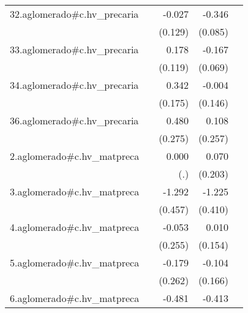 {\begin{longtable}{l*{4}{D{.}{.}{-1}}}
\addlinespace
32.aglomerado#c.hv\_precaria&                     &      -0.027         &      -0.346\sym{***}&                     \\
            &                     &     (0.129)         &     (0.085)         &                     \\
\addlinespace
33.aglomerado#c.hv\_precaria&                     &       0.178         &      -0.167\sym{*}  &                     \\
            &                     &     (0.119)         &     (0.069)         &                     \\
\addlinespace
34.aglomerado#c.hv\_precaria&                     &       0.342         &      -0.004         &                     \\
            &                     &     (0.175)         &     (0.146)         &                     \\
\addlinespace
36.aglomerado#c.hv\_precaria&                     &       0.480         &       0.108         &                     \\
            &                     &     (0.275)         &     (0.257)         &                     \\
\addlinespace
2.aglomerado#c.hv\_matpreca&                     &       0.000         &       0.070         &                     \\
            &                     &         (.)         &     (0.203)         &                     \\
\addlinespace
3.aglomerado#c.hv\_matpreca&                     &      -1.292\sym{**} &      -1.225\sym{**} &                     \\
            &                     &     (0.457)         &     (0.410)         &                     \\
\addlinespace
4.aglomerado#c.hv\_matpreca&                     &      -0.053         &       0.010         &                     \\
            &                     &     (0.255)         &     (0.154)         &                     \\
\addlinespace
5.aglomerado#c.hv\_matpreca&                     &      -0.179         &      -0.104         &                     \\
            &                     &     (0.262)         &     (0.166)         &                     \\
\addlinespace
6.aglomerado#c.hv\_matpreca&                     &      -0.481         &      -0.413         &                     \\

\end{longtable}}
